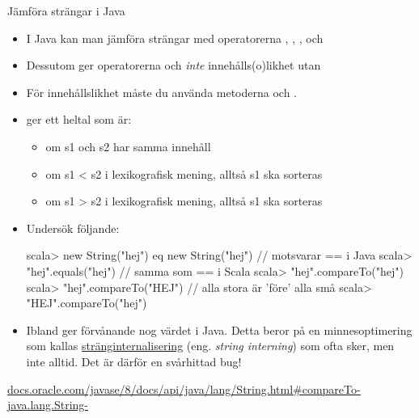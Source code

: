 \begin{Slide}{Jämföra strängar i Java}\SlideFontTiny
\begin{itemize}
\item I Java kan man  jämföra strängar med operatorerna \code{<}, \code{<=}, \code{>}, och \code{>=}

\item Dessutom ger operatorerna \code{==} och \code{!=} \emph{inte} innehålls(o)likhet utan  \code{:(}

\item För innehållslikhet måste du använda metoderna  och . %
\pause
\item {} ger ett heltal som är:
\begin{itemize}\SlideFontTiny
\item {} om s1 och s2 har samma innehåll
\item {} om s1 < s2 i lexikografisk mening, alltså s1 ska sorteras 
\item {} om s1 > s2 i lexikografisk mening, alltså s1 ska sorteras 
\end{itemize}

\pause
\item Undersök följande:
\begin{REPL}
scala> new String("hej") eq new String("hej") // motsvarar == i Java
scala> "hej".equals("hej")                    // samma som == i Scala
scala> "hej".compareTo("hej")
scala> "hej".compareTo("HEJ")         // alla stora är 'före' alla små
scala> "HEJ".compareTo("hej")
\end{REPL}

\item Ibland ger  förvånande nog värdet  i Java. Detta beror på en minnesoptimering som kallas \href{https://stackoverflow.com/questions/10578984/what-is-java-string-interning}{stränginternalisering} (eng. \textit{string interning}) som ofta sker, men inte alltid. Det är därför en svårhittad bug!
\end{itemize}

\href{http://docs.oracle.com/javase/8/docs/api/java/lang/String.html#compareTo-java.lang.String-}{docs.oracle.com/javase/8/docs/api/java/lang/String.html\#compareTo-java.lang.String-}
\end{Slide}


